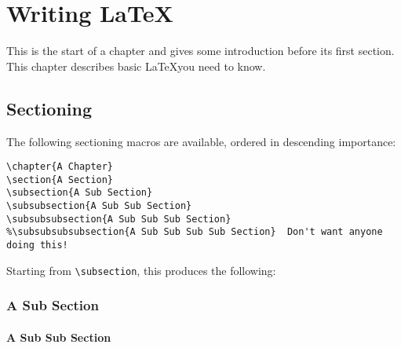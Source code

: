 
\chapter{Writing \LaTeX}

This is the start of a chapter and gives some introduction before its first section.  This chapter describes basic \LaTeX you need to know.

\section{Sectioning}
\label{sec:sectioning}

The following sectioning macros are available, ordered in descending
importance:

\begin{verbatim}
\chapter{A Chapter}
\section{A Section}
\subsection{A Sub Section}
\subsubsection{A Sub Sub Section}
\subsubsubsection{A Sub Sub Sub Section}
%\subsubsubsubsection{A Sub Sub Sub Sub Section}  Don't want anyone doing this!
\end{verbatim}

Starting from \verb|\subsection|, this produces the following:

\subsection{A Sub Section}
\subsubsection{A Sub Sub Section}

